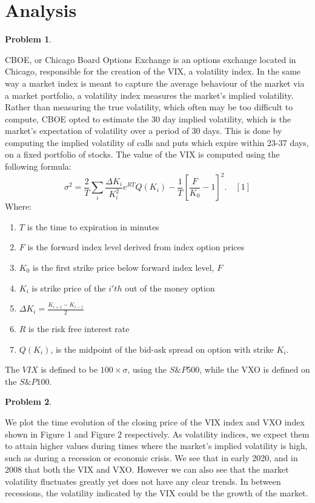 \documentclass[12pt, a4paper]{article}
\newtheorem{problem}{Problem}
\theoremstyle{definition}
\newcommand{\penum}{ \begin{enumerate}[label=\bf(\alph*), leftmargin=0pt]}
\newcommand{\epenum}{ \end{enumerate} }
\begin{document}
\section{Analysis}
\begin{problem}
\end{problem}
\quad CBOE, or Chicago Board Options Exchange is an options exchange located in Chicago, responsible for the creation of the VIX, a volatility index. In the same way a market index is meant to capture the average behaviour of the market via a market portfolio, a volatility index measures the market's implied volatility. 
Rather than measuring the true volatility, which often may be too difficult to compute, CBOE opted to estimate the 30 day implied volatility, which is the market's expectation of volatility over a period of 30 days. This is done by computing the implied volatility of calls and puts which expire within 23-37 days, on a fixed portfolio of stocks. The value of the VIX is computed using the following formula: 
$$\sigma^2 =\frac{2}{T} \sum_i \frac{\Delta K_i}{K_i^2}e^{RT} Q(K_i) - \frac{1}{T} \left[\frac{F}{K_0} - 1  \right]^2. \quad [1] $$
Where: 
\penum
\item  $T$ is the time to expiration in minutes
\item $F$ is the forward index level derived from index option prices
\item $K_0$ is the first strike price below forward index level, $F$
\item $K_i$ is strike price of the $i'th$ out of the money option
\item $\Delta K_i = \frac{K_{i+1} - K_{i-1}}{2}$
\item $R$ is the risk free interest rate
\item $Q(K_i)$, is the midpoint of the bid-ask spread on option with strike $K_i$.
\epenum
The $VIX$ is defined to be $100 \times \sigma$, using the $S \&P 500$, while the VXO is defined on the $S\&P 100$. 
\begin{problem}
\end{problem}
\quad We plot the time evolution of the closing price of the VIX index and VXO index shown in Figure 1 and Figure 2 respectively. As volatility indices, we expect them to attain higher values during times where the market's implied volatility is high, such as during a recession or economic crisis. We see that in early 2020, and in 2008 that both the VIX and VXO. 
However we can also see that the market volatility fluctuates greatly yet does not have any clear trends.  In between recessions, the volatility indicated by the VIX could be the growth of the market. 
\end{document}
